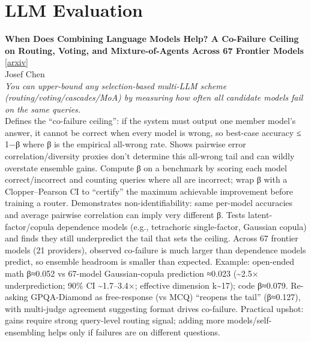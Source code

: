 \documentclass[12pt,letterpaper]{article}
\begin{document}
\medskip


\section*{LLM Evaluation}

{\small\textbf{When Does Combining Language Models Help? A Co-Failure Ceiling on Routing, Voting, and Mixture-of-Agents Across 67 Frontier Models}} {\scriptsize[\href{https://arxiv.org/abs/2606.27288}{arxiv}]}\\
{\scriptsize Josef Chen}\\

{\small\textit{You can upper-bound any selection-based multi-LLM scheme (routing/voting/cascades/MoA) by measuring how often all candidate models fail on the same queries.}}\\[1pt]
{\footnotesize Defines the ``co-failure ceiling'': if the system must output one member model's answer, it cannot be correct when every model is wrong, so best-case accuracy ≤ 1−β where β is the empirical all-wrong rate. Shows pairwise error correlation/diversity proxies don't determine this all-wrong tail and can wildly overstate ensemble gains. Compute β on a benchmark by scoring each model correct/incorrect and counting queries where all are incorrect; wrap β with a Clopper--Pearson CI to ``certify'' the maximum achievable improvement before training a router. Demonstrates non-identifiability: same per-model accuracies and average pairwise correlation can imply very different β. Tests latent-factor/copula dependence models (e.g., tetrachoric single-factor, Gaussian copula) and finds they still underpredict the tail that sets the ceiling. Across 67 frontier models (21 providers), observed co-failure is much larger than dependence models predict, so ensemble headroom is smaller than expected. Example: open-ended math β≈0.052 vs 67-model Gaussian-copula prediction ≈0.023 (\textasciitilde{}2.5× underprediction; 90\% CI \textasciitilde{}1.7--3.4×; effective dimension k\textasciitilde{}17); code β≈0.079. Re-asking GPQA-Diamond as free-response (vs MCQ) ``reopens the tail'' (β≈0.127), with multi-judge agreement suggesting format drives co-failure. Practical upshot: gains require strong query-level routing signal; adding more models/self-ensembling helps only if failures are on different questions.}

\medskip
\end{document}
